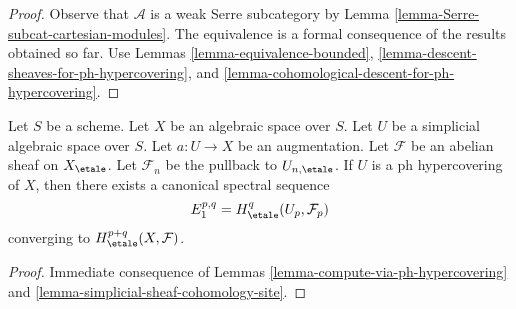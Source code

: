 \begin{proof}
Observe that $\mathcal{A}$ is a weak Serre subcategory by
Lemma \ref{lemma-Serre-subcat-cartesian-modules}.
The equivalence is a
formal consequence of the results obtained so far. Use
Lemmas \ref{lemma-equivalence-bounded},
\ref{lemma-descent-sheaves-for-ph-hypercovering}, and
\ref{lemma-cohomological-descent-for-ph-hypercovering}.
\end{proof}

\begin{lemma}
\label{lemma-spectral-sequence-ph-hypercovering}
Let $S$ be a scheme. Let $X$ be an algebraic space over $S$.
Let $U$ be a simplicial algebraic space over $S$. Let $a : U \to X$
be an augmentation. Let $\mathcal{F}$ be an abelian sheaf
on $X_\etale$. Let $\mathcal{F}_n$ be the pullback to $U_{n, \etale}$.
If $U$ is a ph hypercovering of $X$, then
there exists a canonical spectral sequence
$$
E_1^{p, q} = H^q_\etale(U_p, \mathcal{F}_p)
$$
converging to $H^{p + q}_\etale(X, \mathcal{F})$.
\end{lemma}

\begin{proof}
Immediate consequence of Lemmas \ref{lemma-compute-via-ph-hypercovering}
and \ref{lemma-simplicial-sheaf-cohomology-site}.
\end{proof}
















